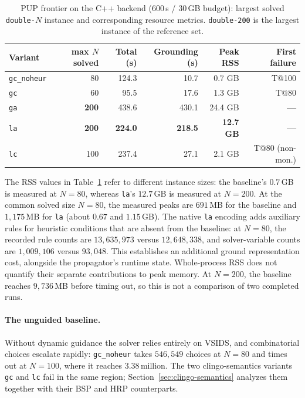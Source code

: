 \begin{table}[H]
\centering
\footnotesize
\setlength{\tabcolsep}{5pt}
\begin{tabular}{lrrrrr}
\toprule
\textbf{Variant} & \textbf{max $N$ solved} & \textbf{Total (s)} & \textbf{Grounding (s)} & \textbf{Peak RSS} & \textbf{First failure}\\
\midrule
\texttt{gc\_noheur} & 80  & 124.3  & 10.7  & 0.7 GB & T@100\\
\texttt{gc}        & 60  & 95.5   & 17.6  & 1.3 GB & T@80\\
\texttt{ga}        & \textbf{200} & 438.6  & 430.1 & 24.4 GB & \textbf{---}\\
\texttt{la}        & \textbf{200} & \textbf{224.0}  & \textbf{218.5} & \textbf{12.7 GB} & \textbf{---}\\
\texttt{lc}        & 100 & 237.4  & 27.1  & 2.1 GB & T@80 (non-mon.)\\
\bottomrule
\end{tabular}
\caption{PUP frontier on the C++ backend ($600$\,s / $30$\,GB budget): largest solved \texttt{double-$N$} instance and corresponding resource metrics. \texttt{double-200} is the largest instance of the reference set.}
\label{tab:pup-frontier}
\end{table}

The RSS values in Table~\ref{tab:pup-frontier} refer to different instance sizes: the baseline's $0.7$\,GB is measured at $N=80$, whereas \texttt{la}'s $12.7$\,GB is measured at $N=200$. At the common solved size $N=80$, the measured peaks are $691$\,MB for the baseline and $1{,}175$\,MB for \texttt{la} (about $0.67$ and $1.15$\,GB). The native \texttt{la} encoding adds auxiliary rules for heuristic conditions that are absent from the baseline: at $N=80$, the recorded rule counts are $13{,}635{,}973$ versus $12{,}648{,}338$, and solver-variable counts are $1{,}009{,}106$ versus $93{,}048$. This establishes an additional ground representation cost, alongside the propagator's runtime state. Whole-process RSS does not quantify their separate contributions to peak memory. At $N=200$, the baseline reaches $9{,}736$\,MB before timing out, so this is not a comparison of two completed runs.

\paragraph{The unguided baseline.}
Without dynamic guidance the solver relies entirely on VSIDS, and combinatorial choices escalate rapidly: \texttt{gc\_noheur} takes $546{,}549$ choices at $N=80$ and times out at $N=100$, where it reaches $3.38$\,million. The two clingo-semantics variants \texttt{gc} and \texttt{lc} fail in the same region; Section~\ref{sec:clingo-semantics} analyzes them together with their BSP and HRP counterparts.

